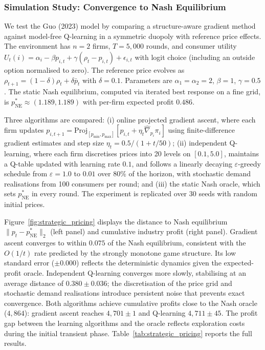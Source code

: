 \subsubsection{Simulation Study: Convergence to Nash Equilibrium}
\label{sec:sim_strategic}

We test the Guo (2023) model by comparing a structure-aware gradient method against model-free Q-learning in a symmetric duopoly with reference price effects. The environment has $n = 2$ firms, $T = 5{,}000$ rounds, and consumer utility $U_t(i) = \alpha_i - \beta p_{i,t} + \gamma(\rho_t - p_{i,t}) + \epsilon_{i,t}$ with logit choice (including an outside option normalised to zero). The reference price evolves as $\rho_{t+1} = (1 - \delta)\rho_t + \delta \bar{p}_t$ with $\delta = 0.1$. Parameters are $\alpha_1 = \alpha_2 = 2$, $\beta = 1$, $\gamma = 0.5$. The static Nash equilibrium, computed via iterated best response on a fine grid, is $p^*_{\text{NE}} \approx (1.189, 1.189)$ with per-firm expected profit $0.486$.

Three algorithms are compared: (i) online projected gradient ascent, where each firm updates $p_{i,t+1} = \text{Proj}_{[p_{\min}, p_{\max}]}[p_{i,t} + \eta_t \hat{\nabla}_{p_i} \pi_i]$ using finite-difference gradient estimates and step size $\eta_t = 0.5/(1 + t/50)$; (ii) independent Q-learning, where each firm discretises prices into 20 levels on $[0.1, 5.0]$, maintains a Q-table updated with learning rate $0.1$, and follows a linearly decaying $\varepsilon$-greedy schedule from $\varepsilon = 1.0$ to $0.01$ over $80\%$ of the horizon, with stochastic demand realisations from 100 consumers per round; and (iii) the static Nash oracle, which sets $p^*_{\text{NE}}$ in every round. The experiment is replicated over 30 seeds with random initial prices.

Figure~\ref{fig:strategic_pricing} displays the distance to Nash equilibrium $\|p_t - p^*_{\text{NE}}\|_2$ (left panel) and cumulative industry profit (right panel). Gradient ascent converges to within $0.075$ of the Nash equilibrium, consistent with the $O(1/t)$ rate predicted by the strongly monotone game structure. Its low standard error ($\pm 0.000$) reflects the deterministic dynamics given the expected-profit oracle. Independent Q-learning converges more slowly, stabilising at an average distance of $0.380 \pm 0.036$; the discretisation of the price grid and stochastic demand realisations introduce persistent noise that prevents exact convergence. Both algorithms achieve cumulative profits close to the Nash oracle ($4{,}864$): gradient ascent reaches $4{,}701 \pm 1$ and Q-learning $4{,}711 \pm 45$. The profit gap between the learning algorithms and the oracle reflects exploration costs during the initial transient phase. Table~\ref{tab:strategic_pricing} reports the full results.

